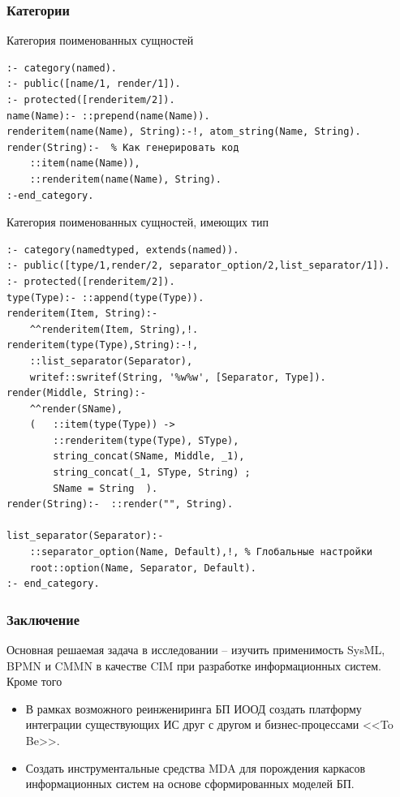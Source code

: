 \documentclass[10pt]{beamer}
\begin{document}
\begin{frame}[fragile]
  \frametitle{Категории}
  Категория поименованных сущностей
\begin{verbatim}
:- category(named).
:- public([name/1, render/1]).
:- protected([renderitem/2]).
name(Name):- ::prepend(name(Name)).
renderitem(name(Name), String):-!, atom_string(Name, String).
render(String):-  % Как генерировать код
    ::item(name(Name)),
    ::renderitem(name(Name), String).
:-end_category.
\end{verbatim}
Категория поименованных сущностей, имеющих тип
\begin{verbatim}
:- category(namedtyped, extends(named)).
:- public([type/1,render/2, separator_option/2,list_separator/1]).
:- protected([renderitem/2]).
type(Type):- ::append(type(Type)).
renderitem(Item, String):-
    ^^renderitem(Item, String),!.
renderitem(type(Type),String):-!,
    ::list_separator(Separator),
    writef::swritef(String, '%w%w', [Separator, Type]).
render(Middle, String):-
    ^^render(SName),
    (   ::item(type(Type)) ->
        ::renderitem(type(Type), SType),
        string_concat(SName, Middle, _1),
        string_concat(_1, SType, String) ;
        SName = String  ).
render(String):-  ::render("", String).

list_separator(Separator):-
    ::separator_option(Name, Default),!, % Глобальные настройки
    root::option(Name, Separator, Default).
:- end_category.

\end{verbatim}
\end{frame}






\begin{frame}
  \frametitle{Заключение}
  Основная решаемая задача в исследовании -- изучить применимость SysML, BPMN и CMMN в качестве CIM при разработке информационных систем. Кроме того
  \begin{itemize}
  \item В рамках возможного реинжениринга БП ИООД создать платформу интеграции существующих ИС друг с другом и бизнес-процессами <<To Be>>.
  \item Создать инструментальные средства MDA для порождения каркасов информационных систем на основе сформированных моделей БП.
  \end{itemize}
\end{frame}
\end{document}
